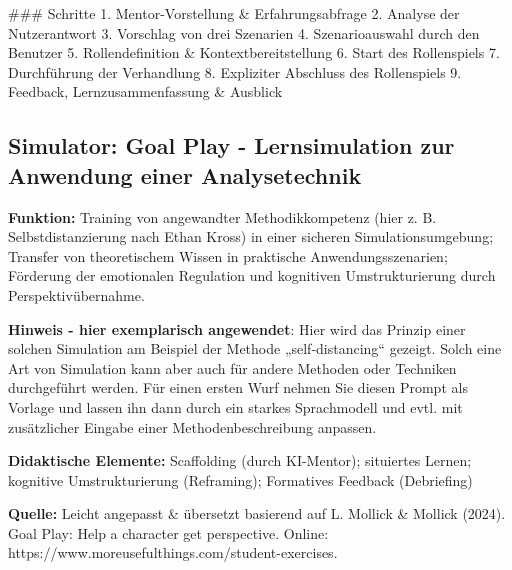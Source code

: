 \documentclass[
  ngerman,
  letterpaper,
  DIV=11]{scrreprt}
\newenvironment{Shaded}{\begin{snugshade}}{\end{snugshade}}
\newcommand{\FunctionTok}[1]{\textcolor[rgb]{0.28,0.35,0.67}{#1}}
\newcommand{\NormalTok}[1]{\textcolor[rgb]{0.00,0.23,0.31}{#1}}
\newcommand{\SpecialStringTok}[1]{\textcolor[rgb]{0.13,0.47,0.30}{#1}}
\begin{document}
\begin{tcolorbox}
\begin{Shaded}
\begin{Highlighting}[]
\FunctionTok{\#\#\# Schritte}
\SpecialStringTok{1. }\NormalTok{Mentor{-}Vorstellung \& Erfahrungsabfrage  }
\SpecialStringTok{2. }\NormalTok{Analyse der Nutzerantwort  }
\SpecialStringTok{3. }\NormalTok{Vorschlag von drei Szenarien  }
\SpecialStringTok{4. }\NormalTok{Szenarioauswahl durch den Benutzer  }
\SpecialStringTok{5. }\NormalTok{Rollendefinition \& Kontextbereitstellung  }
\SpecialStringTok{6. }\NormalTok{Start des Rollenspiels  }
\SpecialStringTok{7. }\NormalTok{Durchführung der Verhandlung  }
\SpecialStringTok{8. }\NormalTok{Expliziter Abschluss des Rollenspiels  }
\SpecialStringTok{9. }\NormalTok{Feedback, Lernzusammenfassung \& Ausblick}
\end{Highlighting}
\end{Shaded}

\end{tcolorbox}

\subsection{Simulator: Goal Play - Lernsimulation zur Anwendung einer
Analysetechnik}\label{sec-prompt-methoden-simulator}

\textbf{Funktion:} Training von angewandter Methodikkompetenz (hier z.
B. Selbstdistanzierung nach Ethan Kross) in einer sicheren
Simulationsumgebung; Transfer von theoretischem Wissen in praktische
Anwendungsszenarien; Förderung der emotionalen Regulation und kognitiven
Umstrukturierung durch Perspektivübernahme.

\textbf{Hinweis - hier exemplarisch angewendet}: Hier wird das Prinzip
einer solchen Simulation am Beispiel der Methode „self-distancing``
gezeigt. Solch eine Art von Simulation kann aber auch für andere
Methoden oder Techniken durchgeführt werden. Für einen ersten Wurf
nehmen Sie diesen Prompt als Vorlage und lassen ihn dann durch ein
starkes Sprachmodell und evtl. mit zusätzlicher Eingabe einer
Methodenbeschreibung anpassen.

\textbf{Didaktische Elemente:} Scaffolding (durch KI-Mentor); situiertes
Lernen; kognitive Umstrukturierung (Reframing); Formatives Feedback
(Debriefing)

\textbf{Quelle:} Leicht angepasst \& übersetzt basierend auf L. Mollick
\& Mollick (2024). Goal Play: Help a character get perspective. Online:
https://www.moreusefulthings.com/student-exercises.
\end{document}
